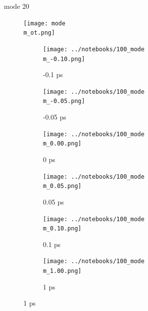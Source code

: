 \documentclass{beamer}
\begin{document}
\renewcommand\m{20}
\begin{frame}{mode \m}
					\vspace{\vh mm}
	\begin{figure}
		\centering
		\texttt{[image: mode\\m\_ot.png]}
	\end{figure}
	\begin{figure}
		\centering
		\begin{subfigure}[b]{\w\textwidth}
			\centering
			\texttt{[image: ../notebooks/100\_mode\\m\_-0.10.png]}
			\caption{-0.1 ps}
		\end{subfigure}
		\begin{subfigure}[b]{\w\textwidth}
			\centering
			\texttt{[image: ../notebooks/100\_mode\\m\_-0.05.png]}
			\caption{-0.05 ps}
		\end{subfigure}
		\begin{subfigure}[b]{\w\textwidth}
			\centering
			\texttt{[image: ../notebooks/100\_mode\\m\_0.00.png]}
			\caption{0 ps}
		\end{subfigure}
		\begin{subfigure}[b]{\w\textwidth}
			\centering
			\texttt{[image: ../notebooks/100\_mode\\m\_0.05.png]}
			\caption{0.05 ps}
		\end{subfigure}
		\begin{subfigure}[b]{\w\textwidth}
			\centering
			\texttt{[image: ../notebooks/100\_mode\\m\_0.10.png]}
			\caption{0.1 ps}
		\end{subfigure}
		\begin{subfigure}[b]{\w\textwidth}
			\centering
			\texttt{[image: ../notebooks/100\_mode\\m\_1.00.png]}
			\caption{1 ps}
		\end{subfigure}
	\end{figure}
\end{frame}
\end{document}
